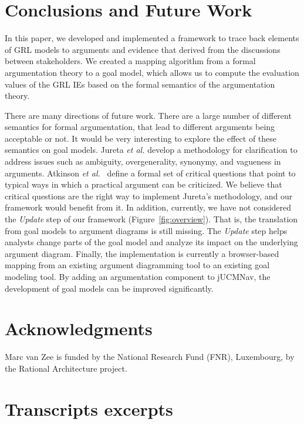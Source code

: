 \documentclass[11.5pt,two column]{llncs}
\begin{document}
\section{Conclusions and Future Work}
\label{sect:conclusion}

In this paper, we developed and implemented a framework to trace back elements of GRL models to arguments and evidence that derived from the discussions between stakeholders. We created a mapping algorithm from a formal argumentation theory to a goal model, which allows us to compute the evaluation values of the GRL IEs based on the formal semantics of the argumentation theory. 

There are many directions of future work. There are a large number of different semantics for formal argumentation, that lead to different arguments being acceptable or not. It would be very interesting to explore the effect of these semantics on goal models. Jureta \emph{et al.} develop a methodology for clarification to address issues such as ambiguity, overgenerality, synonymy, and vagueness in arguments. Atkinson \emph{et al.}~\cite{atkinson2007} define a formal set of critical questions that point to typical ways in which a practical argument can be criticized. We believe that critical questions are the right way to implement Jureta's methodology, and our framework would benefit from it. In addition, currently, we have not considered the \emph{Update} step of our framework (Figure~\ref{fig:overview}). That is, the translation from goal models to argument diagrams is still missing. The \emph{Update} step helps analysts change parts of the goal model and analyze its impact  on the underlying argument diagram. Finally, the implementation is currently a browser-based mapping from an existing argument diagramming tool to an existing goal modeling tool. By adding an argumentation component to jUCMNav, the development of goal models can be improved significantly. 

\section*{Acknowledgments}
Marc van Zee is funded by the National Research Fund (FNR), Luxembourg, by the Rational Architecture project.




\newpage

\onecolumn
\appendix

\section{Transcripts excerpts}
\label{sect:transcripts:excerpts}
\end{document}
